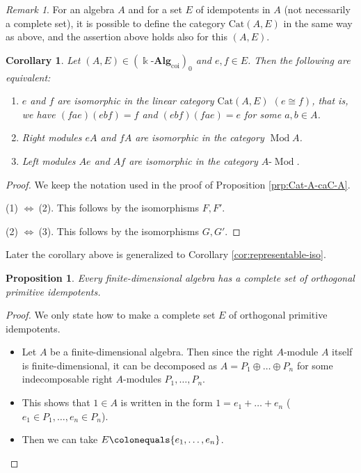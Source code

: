 \documentclass{surv-l}
\numberwithin{equation}{chapter}
\numberwithin{figure}{chapter}
\theoremstyle{plain}
\newtheorem{prp}[thm]{Proposition}
\newtheorem{cor}[thm]{Corollary}
\theoremstyle{definition}
\theoremstyle{remark}
\newtheorem{rmk}[thm]{Remark}
\newcommand{\lMod}{\text{-}\!\Mod}
\DeclareMathOperator{\Mod}{Mod}
\begin{document}
\begin{rmk}
For an algebra $A$ and for a set $E$ of idempotents in $A$
(not necessarily a complete set),
it is possible to define the category $\mathrm{Cat}(A, E)$ in the same way as above,
and the assertion above holds also for this $(A, E)$.
\end{rmk}

\begin{cor}\label{cor:idemp-iso}
Let $(A, E) \in (\Bbbk\text{-}\mathbf{Alg}_{\mathrm{coi}})_0$ and $e, f \in E$.
Then the following are equivalent:
\begin{enumerate}
\item
$e$ and $f$ are isomorphic in the linear category $\mathrm{Cat}(A, E)$
$(e \cong f)$, that is, we have
$(fae)(ebf) = f$ and $(ebf)(fae) = e$
for some $a, b \in A$.
\item
Right modules $eA$ and $fA$ are isomorphic in the category $\Mod A$.
\item
Left modules $Ae$ and $Af$ are isomorphic in the category $A\lMod$.
\end{enumerate}
\end{cor}

\begin{proof}
We keep the notation used in the proof of Proposition \ref{prp:Cat-A-caC-A}.

(1) $\text{$\Leftrightarrow$}\ $(2).
This follows by the isomorphisms $F, F'$.

(2) $\text{$\Leftrightarrow$}\ $(3).
This follows by the isomorphisms $G, G'$.
\end{proof}

Later the corollary above is generalized to Corollary \ref{cor:representable-iso}.

\begin{prp}\label{prp:exist-copi}
Every finite-dimensional algebra has a complete set of orthogonal primitive idempotents.
\end{prp}

\begin{proof}
We only state how to make a complete set $E$ of orthogonal primitive idempotents.
\begin{itemize}
\item
Let $A$ be a finite-dimensional algebra.
Then since the right $A$-module $A$ itself is finite-dimensional, it can be decomposed
as
$A = P_1 \oplus \dots \oplus P_n$
for some indecomposable right $A$-modules $P_1,\dots,P_n$.
\item
This shows that $1 \in A$ is written in the form
$1=e_1+\dots+e_n$ ($e_1 \in P_1, \dots, e_n \in P_n$).
\item
Then we can take $E\colonequals \{e_1,\dots, e_n\}$. %
\qedhere
\end{itemize}
\end{proof}
\end{document}
